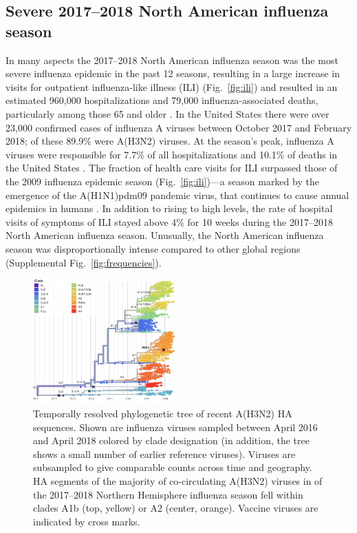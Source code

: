 \subsection*{Severe 2017--2018 North American influenza season}
In many aspects the 2017--2018 North American influenza season was the most severe influenza epidemic in the past 12 seasons, resulting in a large increase in visits for outpatient influenza-like illness (ILI) (Fig.~\ref{fig:ili}) and resulted in an estimated 960,000 hospitalizations and 79,000 influenza-associated deaths, particularly among those 65 and older \citep{Estimate3:online}.
In the United States there were over 23,000 confirmed cases of influenza A viruses between October 2017 and February 2018; of these 89.9\% were A(H3N2) viruses.
At the season’s peak, influenza A viruses were responsible for 7.7\% of all hospitalizations and 10.1\% of deaths in the United States \citep{MMWR2018}.
The fraction of health care visits for ILI surpassed those of the 2009 influenza epidemic season (Fig.~\ref{fig:ili})---a season marked by the emergence of the A(H1N1)pdm09 pandemic virus, that continues to cause annual epidemics in humans \citep{garten_antigenic_2009}.
In addition to rising to high levels, the rate of hospital visits of symptoms of ILI stayed above 4\% for 10 weeks during the 2017--2018 North American influenza season.
Unusually, the North American influenza season was disproportionally intense compared to other global regions (Supplemental Fig.~\ref{fig:frequencies}).

\begin{figure}[t]
    \begin{center}
    \includegraphics[width=0.49\textwidth]{figures/2y_clades.png}
    \end{center}
    \caption{Temporally resolved phylogenetic tree of recent A(H3N2) HA sequences. Shown are influenza viruses sampled between April 2016 and April 2018 colored by clade designation (in addition, the tree shows a small number of earlier reference viruses). Viruses are subsampled to give comparable counts across time and geography. HA segments of the majority of co-circulating A(H3N2) viruses in of the 2017--2018 Northern Hemisphere influenza season fell within clades A1b (top, yellow) or A2 (center, orange). Vaccine viruses are indicated by cross marks. }
    \label{fig:2y_clades}
\end{figure}

